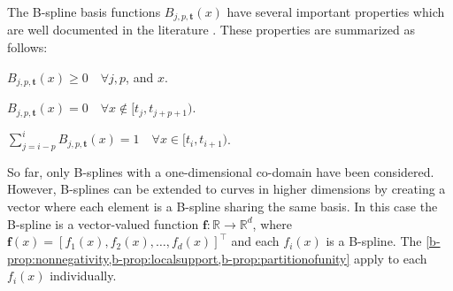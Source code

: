 



The B-spline basis functions $B_{j, p, \mathbf{t}}(x)$ have several important properties which are well documented in the literature \citep{deBoor1978practicalguide}. These properties are summarized as follows:
\begin{property}[Nonnegativity]\label{b-prop:nonnegativity}
    $B_{j, p, \mathbf{t}}(x) \geq 0 \quad\forall j, p$, and $x$.
\end{property}

\begin{property}\label{b-prop:localsupport}
    $B_{j, p, \mathbf{t}}(x)=0 \quad\forall x \notin [t_j, t_{j+p+1})$.
\end{property}

\begin{property}\label{b-prop:partitionofunity}
    $\sum_{j=i-p}^i B_{j, p, \mathbf{t}}(x)=1 \quad\forall x \in [t_i, t_{i+1})$.
\end{property}

So far, only B-splines with a one-dimensional co-domain have been considered. However, B-splines can be extended to curves in higher dimensions by creating a vector where each element is a B-spline sharing the same basis. In this case the B-spline is a vector-valued function $\mathbf{f}: \mathbb R \rightarrow \mathbb R^d$, where $\mathbf{f}(x) = [f_1(x), f_2(x), \dots, f_d(x)]^\top$ and each $f_i(x)$ is a B-spline. The \cref{b-prop:nonnegativity,b-prop:localsupport,b-prop:partitionofunity} apply to each $f_i(x)$ individually. 


